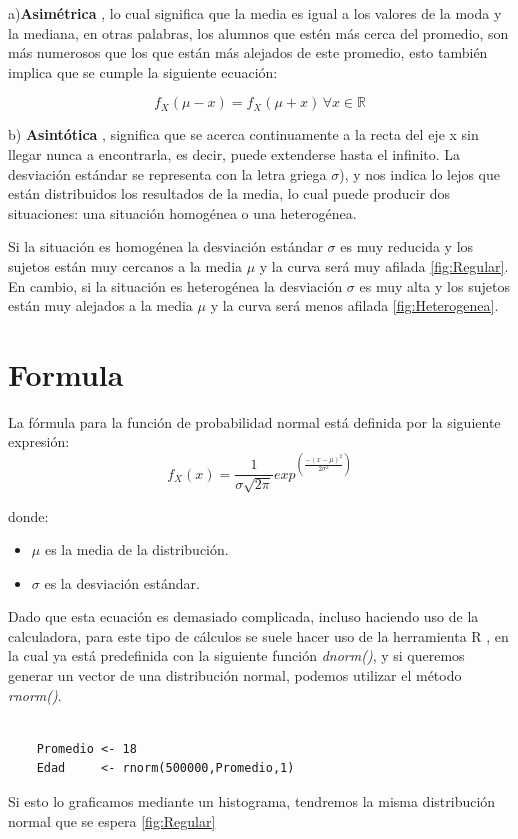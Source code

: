 \documentclass[]{article}
\begin{document}
 a)\textbf{Asimétrica} , lo cual significa que la media es igual a los valores de la moda y la mediana, en otras palabras, los alumnos que estén más cerca del promedio, son más numerosos que los que están más alejados de este promedio, esto también implica que se cumple la siguiente ecuación:
 
\[f_X(\mu - x) = f_X(\mu + x) \, \forall x\in \mathbb{R} \]

  
b)	\textbf{Asintótica} , significa que se acerca continuamente a la recta del eje x sin llegar nunca a encontrarla, es decir, puede extenderse hasta el infinito.
La desviación estándar se representa con la letra griega $\sigma$), y nos indica lo lejos que están distribuidos los resultados de la media, lo cual puede producir dos situaciones: una situación homogénea o una heterogénea.

Si la situación es homogénea la desviación estándar $\sigma$ es muy reducida y los sujetos están muy cercanos a la media  $\mu$ y la curva será muy afilada \autoref{fig:Regular}.
En cambio, si la situación es heterogénea la desviación $\sigma$ es muy alta y los sujetos están muy alejados a la media $\mu$ y la curva será menos afilada \autoref{fig:Heterogenea}.


\section{Formula}
La fórmula para la función de probabilidad normal está definida por la siguiente expresión:
\[f_X(x) = \frac{1}{\sigma \sqrt{2\pi }}exp^{(\frac{-(x-\mu)^{2}}{2\sigma^{2} })}\]

donde:
\begin{itemize}
	\item $\mu$ es la media de la distribución.
	\item $\sigma$ es la desviación estándar.
\end{itemize}
Dado que esta ecuación es demasiado complicada, incluso haciendo uso de la calculadora, para este tipo de cálculos se suele hacer uso de la herramienta R \cite{rproject}, en la cual ya está predefinida con la siguiente función \textit{dnorm()}, y si queremos generar un vector de una distribución normal, podemos utilizar el método \textit{rnorm()}.
  \begin{lstlisting}

    Promedio <- 18
    Edad     <- rnorm(500000,Promedio,1)
   \end{lstlisting}

Si esto lo graficamos mediante un histograma, tendremos la misma distribución normal que se espera  \autoref{fig:Regular}
\end{document}
